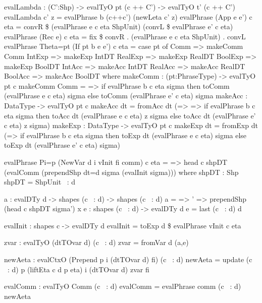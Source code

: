\begin{code}
        evalLambda : (C':Shp) -> evalTyO pt (c ++ C') -> evalTyO t' (c ++ C')
        evalLambda c' z = evalPhrase b (c++c') (newLeta c' z)
evalPhrase (App e e') c eta = convR \$ (evalPhrase e c eta ShpUnit) (convL \$ evalPhrase e' c eta)
evalPhrase (Rec e) c eta = fix \$ convR . (evalPhrase e c eta ShpUnit) . convL
evalPhrase {Theta=pt} (If {pt} b e e') c eta =
            case pt of
                Comm        => makeComm Comm
                IntExp      => makeExp IntDT
                RealExp     => makeExp RealDT
                BoolExp     => makeExp BoolDT
                IntAcc      => makeAcc IntDT
                RealAcc     => makeAcc RealDT
                BoolAcc     => makeAcc BoolDT
    where
        makeComm : (pt:PhraseType) -> evalTyO pt c
        makeComm Comm = \sigma => if evalPhrase b c eta sigma
                                    then toComm (evalPhrase e c eta) sigma
                                    else toComm (evalPhrase e' c eta) sigma
        makeAcc : DataType -> evalTyO pt c
        makeAcc dt = fromAcc dt (\z => \sigma => if evalPhrase b c eta sigma
                                                    then toAcc dt (evalPhrase e c eta) z sigma
                                                    else toAcc dt (evalPhrase e' c eta) z sigma)
        makeExp : DataType -> evalTyO pt c
        makeExp dt = fromExp dt (\sigma => if evalPhrase b c eta sigma
                                                then toExp dt (evalPhrase e c eta) sigma
                                                else toExp dt (evalPhrase e' c eta) sigma)

evalPhrase {Pi=p} (NewVar d i vInit fi comm) c eta = 
        \sigma => head c shpDT (evalComm (prependShp {dt=d} sigma (evalInit sigma)))
    where
        shpDT : Shp
        shpDT = ShpUnit ~: d
        
        a : evalDTy d -> shapes (c ~: d) -> shapes (c ~: d)
        a = \x => \sigma' => prependShp (head c shpDT sigma') x
        e : shapes (c ~: d) -> evalDTy d
        e = last (c ~: d) d
        
        evalInit : shapes c -> evalDTy d
        evalInit = toExp d \$ evalPhrase vInit c eta
        
        zvar : evalTyO (dtTOvar d) (c ~: d)
        zvar = fromVar d (a,e)
        
        newAeta : evalCtxO (Prepend p i (dtTOvar d) fi) (c ~: d)
        newAeta = update (c ~: d) p (liftEta c d p eta) i (dtTOvar d) zvar fi
        
        evalComm : evalTyO Comm (c ~: d)
        evalComm = evalPhrase comm (c ~: d) newAeta

\end{code}

